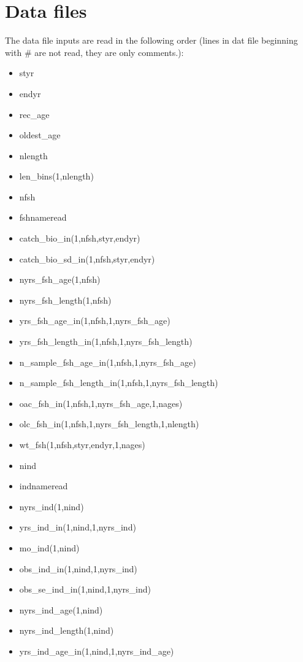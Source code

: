 \documentclass{article}
\begin{document}
\section{Data files}
The data file inputs are read in the following order (lines in dat file beginning with \# are not read, they are only comments.):
\begin{itemize}
    \item styr
    \item endyr
    \item rec\_age
    \item oldest\_age
    \item nlength
    \item len\_bins(1,nlength)
    \item nfsh
    \item fshnameread
    \item catch\_bio\_in(1,nfsh,styr,endyr)
    \item catch\_bio\_sd\_in(1,nfsh,styr,endyr)
    \item nyrs\_fsh\_age(1,nfsh)
    \item nyrs\_fsh\_length(1,nfsh)
    \item yrs\_fsh\_age\_in(1,nfsh,1,nyrs\_fsh\_age)
    \item yrs\_fsh\_length\_in(1,nfsh,1,nyrs\_fsh\_length)
    \item n\_sample\_fsh\_age\_in(1,nfsh,1,nyrs\_fsh\_age)
    \item n\_sample\_fsh\_length\_in(1,nfsh,1,nyrs\_fsh\_length)
    \item oac\_fsh\_in(1,nfsh,1,nyrs\_fsh\_age,1,nages)
    \item olc\_fsh\_in(1,nfsh,1,nyrs\_fsh\_length,1,nlength)
    \item wt\_fsh(1,nfsh,styr,endyr,1,nages)
    \item nind 
    \item indnameread
    \item nyrs\_ind(1,nind)
    \item yrs\_ind\_in(1,nind,1,nyrs\_ind)
    \item mo\_ind(1,nind)
    \item obs\_ind\_in(1,nind,1,nyrs\_ind)
    \item obs\_se\_ind\_in(1,nind,1,nyrs\_ind)
    \item nyrs\_ind\_age(1,nind)
    \item nyrs\_ind\_length(1,nind)
    \item yrs\_ind\_age\_in(1,nind,1,nyrs\_ind\_age)

\end{itemize}
\end{document}
